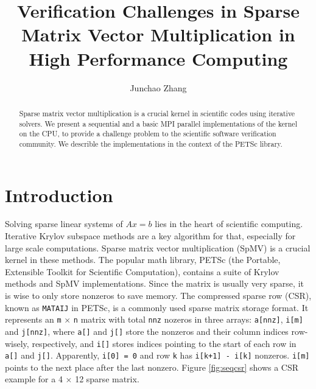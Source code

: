 \documentclass[submission]{eptcs}
\title{Verification Challenges in Sparse Matrix Vector Multiplication in High Performance Computing}
\author{Junchao Zhang
\institute{Argonne National Laboratory, Illinois, USA}
\email{jczhang@anl.gov}
}
\begin{document}
\maketitle

\begin{abstract}
Sparse matrix vector multiplication is a crucial kernel in scientific codes
using iterative solvers. We present a sequential and a basic MPI parallel implementations of
the kernel on the CPU, to provide a challenge problem to the scientific software verification community.
We describle the implementations
in the context of the PETSc library.
\end{abstract}

\section{Introduction}
Solving sparse linear systems of $Ax=b$ lies in the heart of scientific computing.
Iterative Krylov subspace methods \cite{saad2003iterative} are a key algorithm for that,
especially for large scale computations.
Sparse matrix vector multiplication (SpMV) is a crucial kernel in these methods.
The popular math library, PETSc (the Portable, Extensible Toolkit for Scientific Computation)\cite{petsc-user-ref}, contains
a suite of Krylov methods and SpMV implementations.
Since the matrix is usually very sparse,
it is wise to only store nonzeros to save memory.
The compressed sparse row (CSR), known as {\tt MATAIJ} in PETSc,
is a commonly used sparse matrix storage format.
It represents an {\tt m} $\times$ {\tt n} matrix with total {\tt nnz} nozeros in three arrays: {\tt a[nnz]}, {\tt i[m]} and {\tt j[nnz]},
 where {\tt a[]} and {\tt j[]} store the nonzeros and their column indices row-wisely, respectively, and {\tt i[]}
stores indices pointing to the start of each row in {\tt a[]} and {\tt j[]}.
Apparently, {\tt i[0] = 0} and row {\tt k} has {\tt i[k+1] - i[k]} nonzeros. {\tt i[m]} points to the next place
after the last nonzero. Figure \ref{fig:seqcsr} shows a CSR example for a 4 $\times$ 12 sparse matrix.
\end{document}

